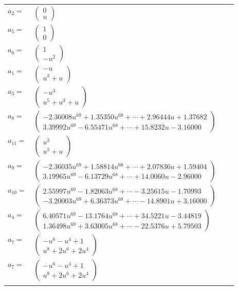 \documentclass[1p]{elsarticle_modified}
\theoremstyle{definition}
\begin{document}
\begin{tabular}{m{7pt} m{180pt} m{7pt} m{180pt} }
\flushright $a_{2}=$&$\begin{pmatrix}0\\u\end{pmatrix}$ \\
\flushright $a_{5}=$&$\begin{pmatrix}1\\0\end{pmatrix}$ \\
\flushright $a_{6}=$&$\begin{pmatrix}1\\- u^2\end{pmatrix}$ \\
\flushright $a_{1}=$&$\begin{pmatrix}- u\\u^3+u\end{pmatrix}$ \\
\flushright $a_{3}=$&$\begin{pmatrix}- u^3\\u^5+u^3+u\end{pmatrix}$ \\
\flushright $a_{8}=$&$\begin{pmatrix}-2.36008 u^{69}+1.35350 u^{68}+\cdots+2.96444 u+1.37682\\3.39992 u^{69}-6.55471 u^{68}+\cdots+15.8232 u-3.16000\end{pmatrix}$ \\
\flushright $a_{11}=$&$\begin{pmatrix}u^3\\u^3+u\end{pmatrix}$ \\
\flushright $a_{9}=$&$\begin{pmatrix}-2.36035 u^{69}+1.58814 u^{68}+\cdots+2.07836 u+1.59404\\3.19965 u^{69}-6.13729 u^{68}+\cdots+14.0060 u-2.96000\end{pmatrix}$ \\
\flushright $a_{10}=$&$\begin{pmatrix}2.55997 u^{69}-1.82063 u^{68}+\cdots-3.25615 u-1.70993\\-3.20003 u^{69}+6.36373 u^{68}+\cdots-14.8901 u+3.16000\end{pmatrix}$ \\
\flushright $a_{4}=$&$\begin{pmatrix}6.40571 u^{69}-13.1764 u^{68}+\cdots+34.5221 u-3.44819\\1.36498 u^{69}+3.63005 u^{68}+\cdots-22.5376 u+5.79503\end{pmatrix}$ \\
\flushright $a_{7}=$&$\begin{pmatrix}- u^6- u^4+1\\u^8+2 u^6+2 u^4\end{pmatrix}$\\ \flushright $a_{7}=$&$\begin{pmatrix}- u^6- u^4+1\\u^8+2 u^6+2 u^4\end{pmatrix}$\\&\end{tabular}
\end{document}
